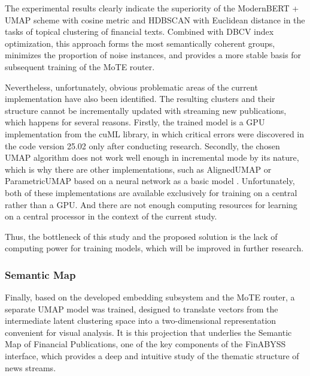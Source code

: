 

The experimental results clearly indicate the superiority of the ModernBERT + UMAP scheme with cosine
metric and HDBSCAN with Euclidean distance in the tasks of topical clustering of financial texts.
Combined with DBCV index optimization, this approach forms the most semantically coherent groups,
minimizes the proportion of noise instances, and provides a more stable basis for subsequent training
of the MoTE router.

Nevertheless, unfortunately, obvious problematic areas of the current implementation have also been
identified. The resulting clusters and their structure cannot be incrementally updated with streaming
new publications, which happens for several reasons. Firstly, the trained model is a GPU implementation
from the cuML library, in which critical errors were discovered in the code version 25.02
\parencite{cuml2020machine} only after conducting research. Secondly, the chosen UMAP algorithm
does not work well enough in incremental mode by its nature, which is why there are other implementations,
such as AlignedUMAP \parencite{mcinnes2018umap-software} or ParametricUMAP based on a neural network
as a basic model \parencite{ParametricUMAP2020}. Unfortunately, both of these implementations are available
exclusively for training on a central rather than a GPU. And there are not enough computing resources
for learning on a central processor in the context of the current study.

Thus, the bottleneck of this study and the proposed solution is the lack of computing power for training
models, which will be improved in further research.

\subsubsection{Semantic Map}

Finally, based on the developed embedding subsystem and the MoTE router, a separate UMAP model was trained,
designed to translate vectors from the intermediate latent clustering space into a two-dimensional
representation convenient for visual analysis. It is this projection that underlies the Semantic Map
of Financial Publications, one of the key components of the FinABYSS interface, which provides a deep
and intuitive study of the thematic structure of news streams.

